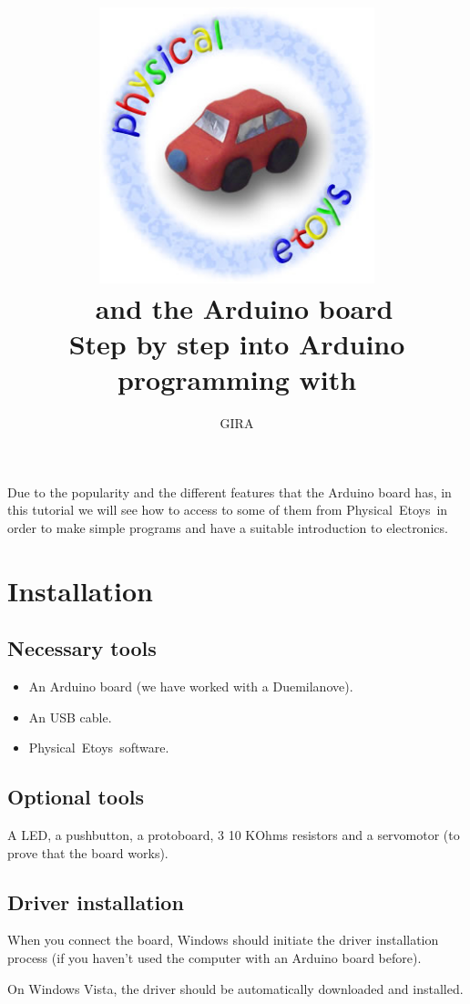 \documentclass[english]{etoys-guide}
\title{
	\includegraphics[width=8cm]{../shared/images/physical_etoys_logo.jpg}\\
	\vfill
	\vspace{3em}
	\LARGE{\textbf{\appName~and the Arduino board}}\\[1cm]
	\large{Step by step into Arduino programming with \appName}\\[1cm]
	\vfill
}
\author{
GIRA
}
\def\appName{Physical~Etoys~}
\begin{document}

\maketitle

\cleardoublepage
\tableofcontents
\cleardoublepage

Due to the popularity and the different features that the Arduino board has, in
this tutorial we will see how to access to some of them from \appName in
order to make simple programs and have a suitable introduction to electronics.  

\section{Installation}

\subsection{Necessary tools}

\begin{itemize}
	\item An Arduino board (we have worked with a Duemilanove).
	\item An USB cable.
	\item \appName software.
\end{itemize}

\subsection{Optional tools}

A LED, a pushbutton, a protoboard, 3 10 KOhms resistors and a servomotor (to
prove that the board works). 

\subsection{Driver installation}

When you connect the board, Windows should initiate the driver installation
process (if you haven't used the computer with an Arduino board before).

On Windows Vista, the driver should be automatically downloaded and installed.
\end{document}
